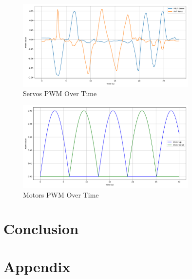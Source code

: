 \documentclass[a4paper]{article}
\begin{document}
\begin{figure}[H]
    \centering
    \includegraphics[width=0.8\textwidth]{imgs/demo_servo_pwm.png}
    \caption{Servos PWM Over Time}
    \label{fig:demo_servo}
\end{figure}

\begin{figure}[H]
    \centering
    \includegraphics[width=0.8\textwidth]{imgs/demo_motor_pwm.png}
    \caption{Motors PWM Over Time}
    \label{fig:demo_motor}
\end{figure}





\clearpage
\section{Conclusion}





\clearpage
\section{Appendix}

\label{code::offboard_control.cpp}




\end{document}
